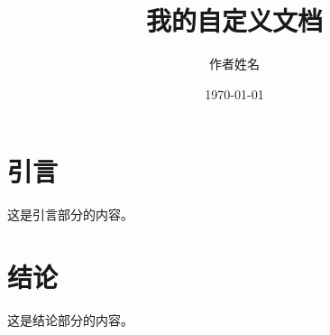 \documentclass[nodate]{myclass}  %
\title{我的自定义文档}
\author{作者姓名}
\date{\today}
\begin{document}
\maketitle

\section{引言}
这是引言部分的内容。

\section{结论}
这是结论部分的内容。
\end{document}
